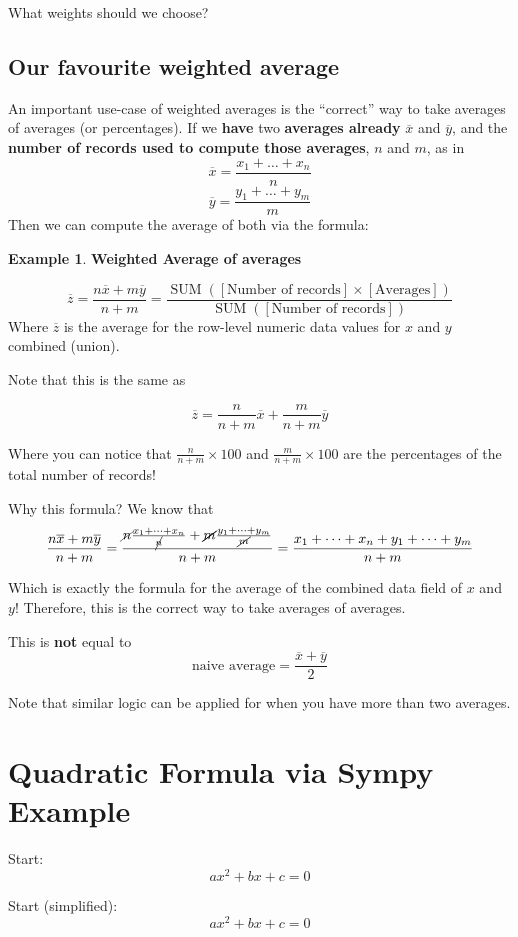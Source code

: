 \documentclass[a4paper]{article}
\theoremstyle{plain} %
\theoremstyle{definition} %
\newtheorem*{example}{Example}
\numberwithin{equation}{subsection}
\begin{document}
What weights should we choose? 
\subsection{Our favourite weighted average}
An important use-case of weighted averages is the ``correct'' way to take averages of averages (or percentages). If we \textbf{have} two \textbf{averages already} $\overline{x}$ and $\overline{y}$, and the \textbf{number of records used to compute those averages}, $n$ and $m$, as in
$$\overline{x} =  \frac{x_1 + \dots + x_n}{n}$$
$$\overline{y} =  \frac{y_1 + \dots + y_m}{m}$$
Then we can compute the average of both via the formula:
\begin{example}
    \textbf{Weighted Average of averages}

    $$ \overline{z} = \frac{n\overline{x}+m\overline{y}}{n+m} = \frac{\operatorname{SUM}([\text{Number of records}]\times[\text{Averages}])}{\operatorname{SUM}([\text{Number of records}])}$$
Where $\overline{z}$ is the average for the row-level numeric data values for $x$ and $y$ combined (union).

Note that this is the same as

$$\overline{z}= \frac{n}{n+m}\overline{x}+ \frac{m}{n+m}\overline{y}$$

Where you can notice that $\frac{n}{n+m}\times100$ and $\frac{m}{n+m}\times100$ are the percentages of the total number of records!
\end{example}
Why this formula? We know that 
$$ \frac{n\overline{x}+m\overline{y}}{n+m} =  \frac{\cancel{n}\frac{x_1 + \dots + x_n}{\cancel{n}}+\cancel{m}\frac{y_1 + \dots + y_m}{\cancel{m}}}{n+m} = \frac{x_1 + \dots + x_n + y_1 + \dots + y_m}{n+m} $$

Which is exactly the formula for the average of the combined data field of $x$ and $y$! Therefore, this is the correct way to take averages of averages. 

This is \textbf{not} equal to 
$$\text{naive average} = \frac{\overline{x}+ \overline{y}}{2}$$

Note that similar logic can be applied for when you have more than two averages.

\newpage

\section{Quadratic Formula via Sympy Example}
Start: $$ a x^{2} + b x + c = 0 $$

Start (simplified): $$ a x^{2} + b x + c = 0 $$
\end{document}

